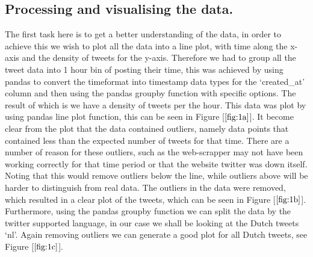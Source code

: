 \documentclass[9pt]{article}
\begin{document}
\subsection{Processing and visualising the data.}
The first task here is to get a better understanding of the data, in order to achieve this
we wish to plot all the data into a line plot, with time along the x-axis and the density
of tweets for the y-axis. Therefore we had to group all the tweet data into 1 hour bin of
posting their time, this was achieved by using pandas to convert the timeformat into
timestamp data types for the `created\_at' column and then using the pandas groupby function with specific options. The
result of which is we have a density of tweets per the hour. This data was plot by using
pandas line plot function, this can be seen in Figure [$\ref{fig:1a}$]. It become clear from the plot that the data contained outliers,
namely data points that contained less than the expected number of tweets for that time. There
are a number of reason for these outliers, such as the web-scrapper may not have been
working correctly for that time period or that the website twitter was down itself. Noting
that this would remove outliers below the line, while outliers above will be harder to
distinguish from real data. The
outliers in the data were removed, which resulted in a clear plot of the tweets, which can
be seen in Figure [$\ref{fig:1b}$]. Furthermore, using the pandas groupby function we can
split the data by the twitter supported language,
in our case we shall be looking at the Dutch tweets `nl'. Again removing outliers we can
generate a good plot for all Dutch tweets, see Figure [$\ref{fig:1c}$].
\end{document}
